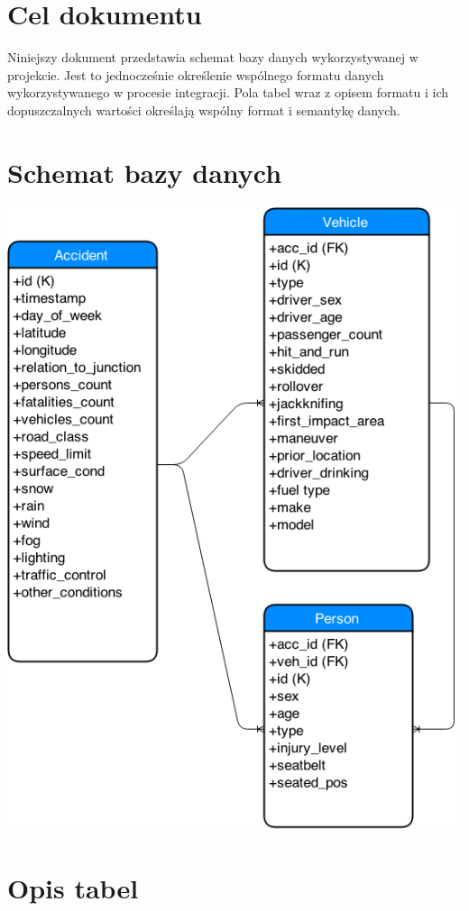 \section{Cel dokumentu}\label{cel-dokumentu}

Niniejszy dokument przedstawia schemat bazy danych wykorzystywanej w
projekcie. Jest to jednocześnie określenie wspólnego formatu danych
wykorzystywanego w procesie integracji. Pola tabel wraz z opisem formatu
i ich dopuszczalnych wartości określają wspólny format i semantykę
danych.

\section{Schemat bazy danych}\label{schemat-bazy-danych}

\includegraphics{images/database.png}

\section{Opis tabel}\label{opis-tabel}


